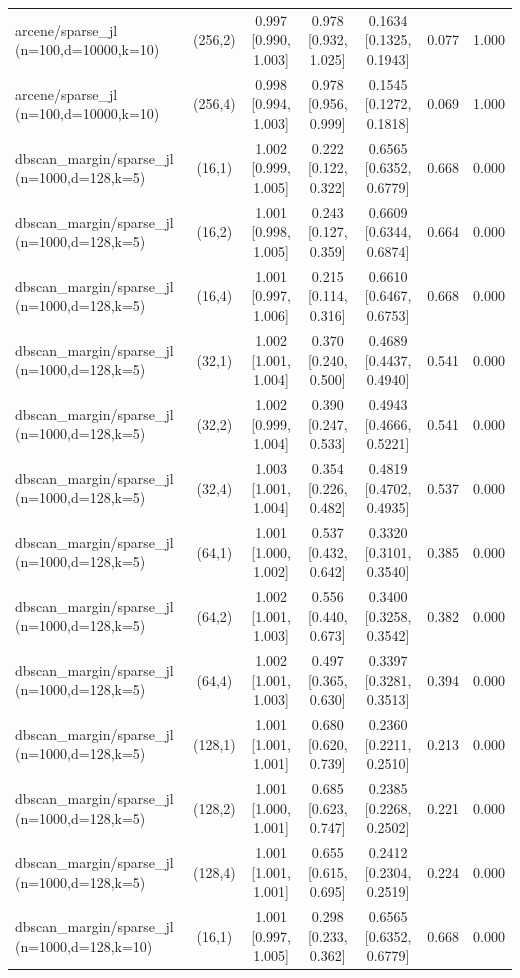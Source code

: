 \begin{tabular}{lcccccc}
arcene/sparse\_jl (n=100,d=10000,k=10) & (256,2) & 0.997 [0.990, 1.003] & 0.978 [0.932, 1.025] & 0.1634 [0.1325, 0.1943] & 0.077 & 1.000 \\
arcene/sparse\_jl (n=100,d=10000,k=10) & (256,4) & 0.998 [0.994, 1.003] & 0.978 [0.956, 0.999] & 0.1545 [0.1272, 0.1818] & 0.069 & 1.000 \\
dbscan\_margin/sparse\_jl (n=1000,d=128,k=5) & (16,1) & 1.002 [0.999, 1.005] & 0.222 [0.122, 0.322] & 0.6565 [0.6352, 0.6779] & 0.668 & 0.000 \\
dbscan\_margin/sparse\_jl (n=1000,d=128,k=5) & (16,2) & 1.001 [0.998, 1.005] & 0.243 [0.127, 0.359] & 0.6609 [0.6344, 0.6874] & 0.664 & 0.000 \\
dbscan\_margin/sparse\_jl (n=1000,d=128,k=5) & (16,4) & 1.001 [0.997, 1.006] & 0.215 [0.114, 0.316] & 0.6610 [0.6467, 0.6753] & 0.668 & 0.000 \\
dbscan\_margin/sparse\_jl (n=1000,d=128,k=5) & (32,1) & 1.002 [1.001, 1.004] & 0.370 [0.240, 0.500] & 0.4689 [0.4437, 0.4940] & 0.541 & 0.000 \\
dbscan\_margin/sparse\_jl (n=1000,d=128,k=5) & (32,2) & 1.002 [0.999, 1.004] & 0.390 [0.247, 0.533] & 0.4943 [0.4666, 0.5221] & 0.541 & 0.000 \\
dbscan\_margin/sparse\_jl (n=1000,d=128,k=5) & (32,4) & 1.003 [1.001, 1.004] & 0.354 [0.226, 0.482] & 0.4819 [0.4702, 0.4935] & 0.537 & 0.000 \\
dbscan\_margin/sparse\_jl (n=1000,d=128,k=5) & (64,1) & 1.001 [1.000, 1.002] & 0.537 [0.432, 0.642] & 0.3320 [0.3101, 0.3540] & 0.385 & 0.000 \\
dbscan\_margin/sparse\_jl (n=1000,d=128,k=5) & (64,2) & 1.002 [1.001, 1.003] & 0.556 [0.440, 0.673] & 0.3400 [0.3258, 0.3542] & 0.382 & 0.000 \\
dbscan\_margin/sparse\_jl (n=1000,d=128,k=5) & (64,4) & 1.002 [1.001, 1.003] & 0.497 [0.365, 0.630] & 0.3397 [0.3281, 0.3513] & 0.394 & 0.000 \\
dbscan\_margin/sparse\_jl (n=1000,d=128,k=5) & (128,1) & 1.001 [1.001, 1.001] & 0.680 [0.620, 0.739] & 0.2360 [0.2211, 0.2510] & 0.213 & 0.000 \\
dbscan\_margin/sparse\_jl (n=1000,d=128,k=5) & (128,2) & 1.001 [1.000, 1.001] & 0.685 [0.623, 0.747] & 0.2385 [0.2268, 0.2502] & 0.221 & 0.000 \\
dbscan\_margin/sparse\_jl (n=1000,d=128,k=5) & (128,4) & 1.001 [1.001, 1.001] & 0.655 [0.615, 0.695] & 0.2412 [0.2304, 0.2519] & 0.224 & 0.000 \\
dbscan\_margin/sparse\_jl (n=1000,d=128,k=10) & (16,1) & 1.001 [0.997, 1.005] & 0.298 [0.233, 0.362] & 0.6565 [0.6352, 0.6779] & 0.668 & 0.000 \\

\end{tabular}
